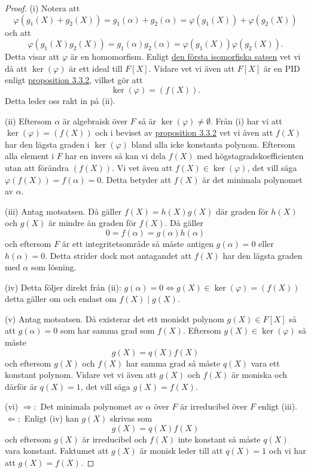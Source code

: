 \documentclass{article}
\theoremstyle{definition}
\begin{document}
\begin{proof}
  (i) Notera att 
  \[\varphi(g_1(X) + g_2(X)) = g_1(\alpha) + g_2(\alpha) = \varphi(g_1(X)) + \varphi(g_2(X))\]
  och att 
  \[\varphi(g_1(X) g_2(X)) = g_1(\alpha) g_2(\alpha) = \varphi(g_1(X)) \varphi(g_2(X)).\]
  Detta visar att $\varphi$ är en homomorfism. Enligt \hyperlink{isomorfiska}{den första isomorfiska satsen} vet vi då att $\ker(\varphi)$ är ett ideal 
  till $F[X]$. Vidare vet vi även att $F[X]$ är en PID enligt \hyperlink{pid}{proposition 3.3.2}, vilket gör att 
  \[\ker(\varphi) = (f(X)).\]
  Detta leder oss rakt in på (ii).

  (ii) Eftersom $\alpha$ är algebraisk över $F$ så är $\ker(\varphi) \neq \emptyset$. Från (i) har vi att $\ker(\varphi) = (f(X))$
  och i beviset av \hyperlink{pid}{proposition 3.3.2} vet vi även att $f(X)$ har den lägsta graden i $\ker(\varphi)$ bland alla icke konstanta polynom. 
  Eftersom alla element i $F$ har en invers så kan vi dela $f(X)$ med högstagradskoefficienten utan att förändra $(f(X))$. Vi vet även att 
  $f(X) \in \ker(\varphi)$, det vill säga $\varphi(f(X)) = f(\alpha) = 0$. Detta betyder att $f(X)$ är det minimala polynomet av $\alpha$.

  (iii) Antag motsatsen. Då gäller $f(X) = h(X)g(X)$ där graden för $h(X)$ och $g(X)$ är mindre än graden för $f(X)$. Då gäller 
  \[0 = f(\alpha) = g(\alpha) h(\alpha)\]
  och eftersom $F$ är ett integritetsområde så måste antigen 
  $g(\alpha) = 0$ eller $h(\alpha) = 0$. Detta strider dock mot antagandet att $f(X)$ har den lägsta graden med $\alpha$ som lösning. 

  (iv) Detta följer direkt från (ii): $g(\alpha) = 0 \iff g(X) \in \ker(\varphi) = (f(X))$ detta gäller om och endast om $f(X) \; | \; g(X).$ 
  
  (v) Antag motsatsen. Då existerar det ett moniskt polynom $g(X) \in F[X]$ så att $g(\alpha) = 0$ som har samma grad som $f(X)$. 
  Eftersom $g(X) \in \ker(\varphi)$ så måste 
  \[g(X) = q(X) f(X)\]
  och eftersom $g(X)$ och $f(X)$ har samma grad så måste $q(X)$ vara ett konstant polynom. Vidare vet vi även att $g(X)$ och $f(X)$ är moniska 
  och därför är $q(X) = 1$, det vill säga $g(X) = f(X)$.

  (vi) $\Rightarrow:$ Det minimala polynomet av $\alpha$ över $F$ är irreducibel över $F$ enligt (iii). 
  $\Leftarrow:$ Enligt (iv) kan $g(X)$ skrivas som 
  \[g(X) = q(X)f(X)\]
  och eftersom $g(X)$ är irreducibel och $f(X)$ inte konstant så måste $q(X)$ vara konstant. Faktumet att $g(X)$ är monisk leder till att 
  $q(X) = 1$ och vi har att $g(X) = f(X).$
\end{proof}
\end{document}

